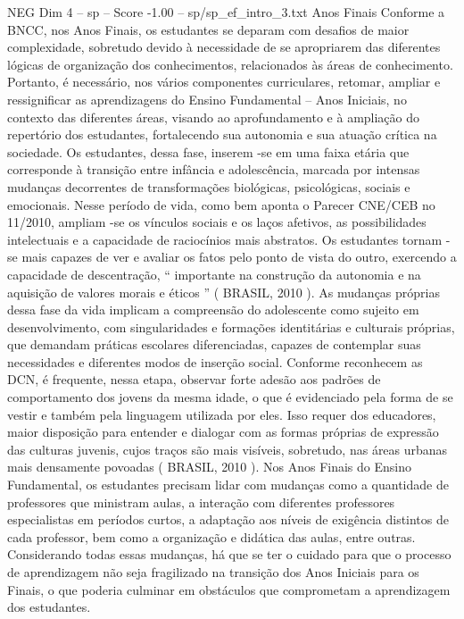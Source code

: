 \begin{textsample}{NEG Dim 4 – sp – Score -1.00 – sp/sp\_ef\_intro\_3.txt}  \label{ex:f4_neg_038}
Anos Finais Conforme a BNCC, nos Anos Finais, os estudantes se deparam com desafios de maior complexidade, sobretudo devido à necessidade de se apropriarem das diferentes lógicas de organização dos conhecimentos, relacionados às áreas de conhecimento.
Portanto, é necessário, nos vários componentes curriculares, retomar, ampliar e ressignificar as aprendizagens do Ensino Fundamental – Anos Iniciais, no contexto das diferentes áreas, visando ao aprofundamento e à ampliação do repertório dos estudantes, fortalecendo sua autonomia e sua atuação crítica na sociedade.
Os estudantes, dessa fase, inserem -se em uma faixa etária que corresponde à transição entre infância e adolescência, marcada por intensas mudanças decorrentes de transformações biológicas, psicológicas, sociais e emocionais.
Nesse período de vida, como bem aponta o Parecer CNE/CEB no 11/2010, ampliam -se os vínculos sociais e os laços afetivos, as possibilidades intelectuais e a capacidade de raciocínios mais abstratos.
Os estudantes tornam -se mais capazes de ver e avaliar os fatos pelo ponto de vista do outro, exercendo a capacidade de descentração, “ importante na construção da autonomia e na aquisição de valores morais e éticos ” ( BRASIL, 2010 ).
As mudanças próprias dessa fase da vida implicam a compreensão do adolescente como sujeito em desenvolvimento, com singularidades e formações identitárias e culturais próprias, que demandam práticas escolares diferenciadas, capazes de contemplar suas necessidades e diferentes modos de inserção social.
Conforme reconhecem as DCN, é frequente, nessa etapa, observar forte adesão aos padrões de comportamento dos jovens da mesma idade, o que é evidenciado pela forma de se vestir e também pela linguagem utilizada por eles.
Isso requer dos educadores, maior disposição para entender e dialogar com as formas próprias de expressão das culturas juvenis, cujos traços são mais visíveis, sobretudo, nas áreas urbanas mais densamente povoadas ( BRASIL, 2010 ).
Nos Anos Finais do Ensino Fundamental, os estudantes precisam lidar com mudanças como a quantidade de professores que ministram aulas, a interação com diferentes professores especialistas em períodos curtos, a adaptação aos níveis de exigência distintos de cada professor, bem como a organização e didática das aulas, entre outras.
Considerando todas essas mudanças, há que se ter o cuidado para que o processo de aprendizagem não seja fragilizado na transição dos Anos Iniciais para os Finais, o que poderia culminar em obstáculos que comprometam a aprendizagem dos estudantes.

\end{textsample}
